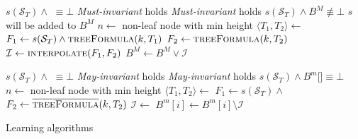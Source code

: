 \begin{algorithm}[t]
    \begin{algorithmic}[1]
        \Require $s(\mathcal{S}_T) \land $  $\equiv \bot$
        \Require \emph{Must-invariant} holds
        \Ensure \emph{Must-invariant} holds
        \Ensure $s(\mathcal{S}_T) \land B^M \not\equiv \bot$
        \Comment $s$ will be added to $B^M$
                \Return
            \EndIIf
            \State $n \gets $ non-leaf node with min height 
            \State $\langle T_1, T_2 \rangle \gets $ 
            \State $F_1 \gets s(\mathcal{S}_T) \land \Call{treeFormula}{k, T_1}$
            \State $F_2 \gets \Call{treeFormula}{k, T_2}$
            \State $\mathcal{I} \gets  \Call{interpolate}{F_1, F_2}$
            \State $B^M \gets B^M \lor \mathcal{I}$
            \State {}
        \EndFunction
    \end{algorithmic}
    
    \begin{algorithmic}[1]
        \Require $s(\mathcal{S}_T) \land $  $\equiv \bot$
        \Require \emph{May-invariant} holds
        \Ensure \emph{May-invariant} holds
        \Ensure $s(\mathcal{S}_T) \land B^m[$$] \equiv \bot$
                \Return
            \EndIIf
            \State $n \gets $ non-leaf node with min height 
            \State $\langle T_1, T_2 \rangle \gets $ 
            \State $F_1 \gets s(\mathcal{S}_T) \land $ 
            \State $F_2 \gets \Call{\textoverline{treeFormula}}{k, T_2}$
            \State $\mathcal{I} \gets $ 
                \State $B^m[i] \gets B^m[i] \setminus \mathcal{I}$
            \EndFor
            \State {}
        \EndFunction
    \end{algorithmic}
    \caption{Learning algorithms}
    \label{alg:learn}
\end{algorithm}


